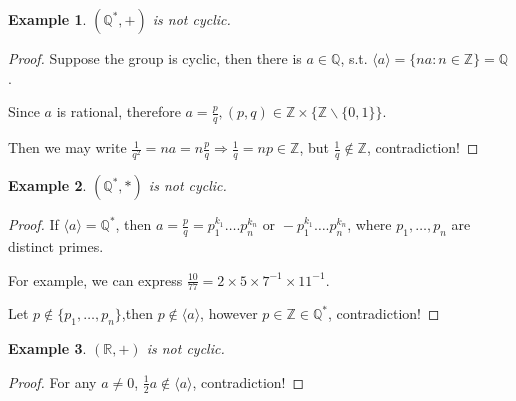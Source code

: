 \documentclass{article}
\theoremstyle{MyNonumberplain}
\theoremstyle{break}
\newtheorem*{proof}{Proof. }
\newcommand{\cyclic}[1]{\langle #1 \rangle}
\newcommand{\nin}{\not\in}
\newcommand{\infixor}{\text{ or }}
\theoremstyle{break}
\newtheorem{example}{Example}[section]
\theoremstyle{break}
\theoremstyle{definition}
\theoremstyle{break}
\begin{document}
\begin{expbox}
    \begin{example}
        $(\mathbb{Q}^{\ast}, +)$ is not cyclic.
    \end{example}
    \begin{prfbox}
        \begin{proof}
            Suppose the group is cyclic, then there is $ a \in \mathbb{Q}$, s.t. $\cyclic{a} = \{ n a : n \in \mathbb{Z} \} =\mathbb{Q}$.\bigskip
    
            Since $a$ is rational, therefore $a = \frac{p}{q}, (p, q) \in \mathbb{Z} \times \{\mathbb{Z} \backslash \{ 0,1 \}\}$.\bigskip
    
            Then we may write $\frac{1}{q^2} = n a = n \frac{p}{q} \Rightarrow \frac{1}{q} = n p \in \mathbb{Z}$, but $\frac{1}{q} \nin \mathbb{Z}$, contradiction!
        \end{proof}
    \end{prfbox}
    
\end{expbox}



\begin{expbox}
    \begin{example}
        $(\mathbb{Q}^{\ast}, *)$ is not cyclic.
    \end{example}
    \begin{prfbox}
        \begin{proof}
            If $\cyclic{a} =\mathbb{Q}^{\ast}$, then $a = \frac{p}{q} = p^{k_1}_1 \ldots .p^{k_n}_n \infixor - p^{k_1}_1 \ldots .p^{k_n}_n$, where $p_1, \ldots, p_n$ are distinct primes.\bigskip
    
            For example, we can express $\frac{10}{77} = 2 \times 5 \times 7^{- 1} \times 11^{- 1}$.\bigskip
    
            Let $p \nin \{ p_1, \ldots, p_n \}$,then $p \nin \cyclic{a}$, however $p \in \mathbb{Z} \in \mathbb{Q}^{\ast}$, contradiction!
        \end{proof}
    \end{prfbox}
    
\end{expbox}



\begin{expbox}
    \begin{example}
        $(\mathbb{R}, +)$ is not cyclic.
    \end{example}
    \begin{prfbox}
        \begin{proof}
            For any $a\neq 0$, $\frac{1}{2}a \nin \cyclic{a}$, contradiction!
        \end{proof}
    \end{prfbox}
    
\end{expbox}
\end{document}
